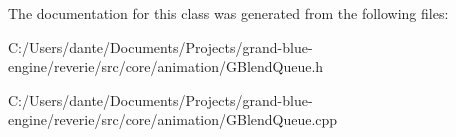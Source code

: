 The documentation for this class was generated from the following files\+:\begin{DoxyCompactItemize}
\item 
C\+:/\+Users/dante/\+Documents/\+Projects/grand-\/blue-\/engine/reverie/src/core/animation/G\+Blend\+Queue.\+h\item 
C\+:/\+Users/dante/\+Documents/\+Projects/grand-\/blue-\/engine/reverie/src/core/animation/G\+Blend\+Queue.\+cpp\end{DoxyCompactItemize}
